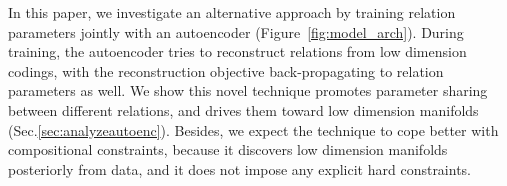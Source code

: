 \documentclass[11pt,a4paper]{article}
\begin{document}


In this paper, we investigate an alternative approach by 
training relation parameters jointly with an autoencoder (Figure~\ref{fig:model_arch}). 
During training, the autoencoder tries to 
reconstruct relations from low dimension codings, with the 
reconstruction objective back-propagating to relation parameters 
as well. We show this novel technique promotes 
parameter sharing between different relations, and drives them toward 
low dimension manifolds (Sec.\ref{sec:analyzeautoenc}). Besides, 
we expect the technique to cope better with compositional constraints, because 
it discovers low dimension manifolds 
posteriorly from data, and it does not impose any explicit hard constraints.
\end{document}
